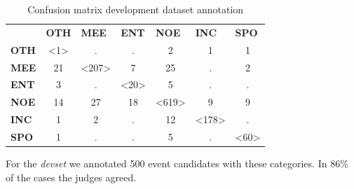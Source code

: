 \documentclass[
10pt, %
a4paper, %
oneside, %
headinclude,footinclude, %
BCOR5mm, %
]{scrartcl}
\begin{document}
\begin{table}[h]
\caption[Confusion matrix testset annotation]{Confusion matrix development dataset annotation }
\begin{tabular}{lcccccc}
 & \multicolumn{1}{l}{\textbf{OTH}} & \multicolumn{1}{l}{\textbf{MEE}} & \multicolumn{1}{l}{\textbf{ENT}} & \multicolumn{1}{l}{\textbf{NOE}} & \multicolumn{1}{l}{\textbf{INC}} & \multicolumn{1}{l}{\textbf{SPO}} \\ \cline{2-7} 
\multicolumn{1}{l|}{\textbf{OTH}} & \multicolumn{1}{c|}{\textless1\textgreater} & \multicolumn{1}{c|}{.} & \multicolumn{1}{c|}{.} & \multicolumn{1}{c|}{2} & \multicolumn{1}{c|}{1} & \multicolumn{1}{c|}{1} \\ \cline{2-7} 
\multicolumn{1}{l|}{\textbf{MEE}} & \multicolumn{1}{c|}{21} & \multicolumn{1}{c|}{\textless207\textgreater} & \multicolumn{1}{c|}{7} & \multicolumn{1}{c|}{25} & \multicolumn{1}{c|}{.} & \multicolumn{1}{c|}{2} \\ \cline{2-7} 
\multicolumn{1}{l|}{\textbf{ENT}} & \multicolumn{1}{c|}{3} & \multicolumn{1}{c|}{.} & \multicolumn{1}{c|}{\textless20\textgreater} & \multicolumn{1}{c|}{5} & \multicolumn{1}{c|}{.} & \multicolumn{1}{c|}{.} \\ \cline{2-7} 
\multicolumn{1}{l|}{\textbf{NOE}} & \multicolumn{1}{c|}{14} & \multicolumn{1}{c|}{27} & \multicolumn{1}{c|}{18} & \multicolumn{1}{c|}{\textless619\textgreater} & \multicolumn{1}{c|}{9} & \multicolumn{1}{c|}{9} \\ \cline{2-7} 
\multicolumn{1}{l|}{\textbf{INC}} & \multicolumn{1}{c|}{1} & \multicolumn{1}{c|}{2} & \multicolumn{1}{c|}{.} & \multicolumn{1}{c|}{12} & \multicolumn{1}{c|}{\textless178\textgreater} & \multicolumn{1}{c|}{.} \\ \cline{2-7} 
\multicolumn{1}{l|}{\textbf{SPO}} & \multicolumn{1}{c|}{1} & \multicolumn{1}{c|}{.} & \multicolumn{1}{c|}{.} & \multicolumn{1}{c|}{5} & \multicolumn{1}{c|}{.} & \multicolumn{1}{c|}{\textless60\textgreater} \\ \cline{2-7} 
\end{tabular}

\end{table}
For the \textit{devset} we annotated 500 event candidates with these categories. In 86\% of the cases the judges agreed.
\end{document}
